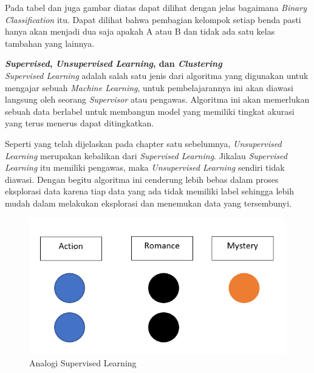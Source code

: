\documentclass{report}
\begin{document}
\vspace{0.1cm}
\hangindent=0.5cm Pada tabel dan juga gambar diatas dapat dilihat  dengan jelas bagaimana \emph{Binary Classification} itu. Dapat dilihat bahwa pembagian kelompok setiap benda pasti hanya akan menjadi dua saja apakah A atau B dan tidak ada satu kelas tambahan yang lainnya.

\vspace{0.5cm}

{\bf \emph{Supervised}, \emph{Unsupervised Learning}, dan \emph{Clustering}}
\vspace{0.1cm}
\\\hangindent=0.5cm \emph{Supervised Learning} adalah salah satu jenis dari algoritma yang digunakan untuk mengajar sebuah \emph{Machine Learning}, untuk pembelajarannya ini akan diawasi langsung oleh seorang \emph{Supervisor} atau pengawas. Algoritma ini akan memerlukan sebuah data berlabel untuk membangun model yang memiliki tingkat akurasi yang terus menerus dapat ditingkatkan.

\vspace{0.4cm}
\hangindent=0.5cm Seperti yang telah dijelaskan pada chapter satu sebelumnya, \emph{Unsupervised Learning} merupakan kebalikan dari  \emph{Supervised Learning}. Jikalau \emph{Supervised Learning} itu memiliki pengawas, maka \emph{Unsupervised Learning} sendiri tidak diawasi. Dengan begitu algoritma ini cenderung lebih bebas dalam proses eksplorasi data karena tiap data yang ada tidak memiliki label sehingga lebih mudah dalam melakukan eksplorasi dan menemukan data yang tersembunyi.

 \begin{figure}[hbtp]
 \caption{Analogi Supervised Learning}
 \centering
 \includegraphics[scale=0.4]{../figures/supervised learning.png}
 \end{figure}
 
\end{document}
